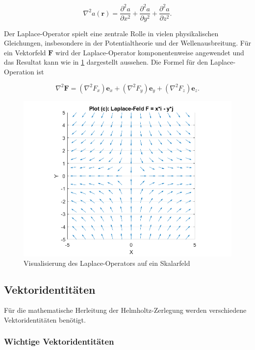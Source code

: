 \begin{equation}
\nabla^2 a(\mathbf{r}) = \frac{\partial^2 a}{\partial x^2} + \frac{\partial^2 a}{\partial y^2} + \frac{\partial^2 a}{\partial z^2}.
\end{equation}

Der Laplace-Operator spielt eine zentrale Rolle in vielen physikalischen Gleichungen, insbesondere in der Potentialtheorie und der Wellenausbreitung. Für ein Vektorfeld $\mathbf{F}$ wird der Laplace-Operator komponentenweise angewendet und das Resultat kann wie in \ref{fig:LaplaceAlg} dargestellt aussehen. Die Formel für den Laplace-Operation ist

\begin{equation}
\nabla^2 \mathbf{F} = (\nabla^2 F_x)\mathbf{e}_x + (\nabla^2 F_y)\mathbf{e}_y + (\nabla^2 F_z)\mathbf{e}_z.
\end{equation}

\begin{figure}[h!]
    \centering
    \includegraphics[scale=0.4]{papers/helmholtz/images/Laplace_Feld.png}
    \caption{Visualisierung des Laplace-Operators auf ein Skalarfeld}
    \label{fig:LaplaceAlg}
\end{figure}


\subsection{Vektoridentitäten
\label{helmholtz:subsection:Vektoridentitaeten}}
Für die mathematische Herleitung der Helmholtz-Zerlegung werden verschiedene Vektoridentitäten benötigt.

\subsubsection{Wichtige Vektoridentitäten}

